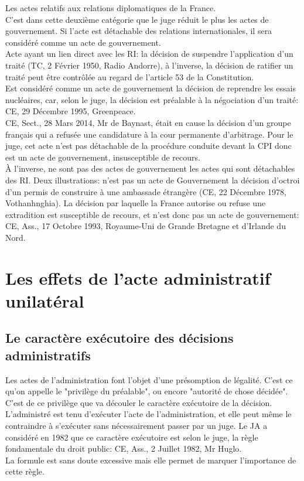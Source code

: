 \documentclass[10pt, a4paper, openany]{book}
\begin{document}
Les actes relatifs aux relations diplomatiques de la France. \\
C'est dans cette deuxième catégorie que le juge réduit le plus les actes de gouvernement. Si l'acte est détachable des relations internationales, il sera considéré comme un acte de gouvernement. \\
Acte ayant un lien direct avec les RI: la décision de suspendre l'application d'un traité (TC, 2 Février 1950, Radio Andorre), à l'inverse, la décision de ratifier un traité peut être contrôlée au regard de l'article 53 de la Constitution. \\
Est considéré comme un acte de gouvernement la décision de reprendre les essais nucléaires, car, selon le juge, la décision est préalable à la négociation d'un traité: CE, 29 Décembre 1995, Greenpeace. \\
CE, Sect., 28 Mars 2014, Mr de Baynast, était en cause la décision d'un groupe français qui a refusée une candidature à la cour permanente d'arbitrage. Pour le juge, cet acte n'est pas détachable de la procédure conduite devant la CPI donc est un acte de gouvernement, insusceptible de recours. \\
À l'inverse, ne sont pas des actes de gouvernement les actes qui sont détachables des RI. Deux illustrations: n'est pas un acte de Gouvernement la décision d'octroi d'un permis de construire à une ambassade étrangère (CE, 22 Décembre 1978, Vothanhnghia). La décision par laquelle la France autorise ou refuse une extradition est susceptible de recours, et n'est donc pas un acte de gouvernement: CE, Ass., 17 Octobre 1993, Royaume-Uni de Grande Bretagne et d'Irlande du Nord.


\section{Les effets de l'acte administratif unilatéral}

\subsection{Le caractère exécutoire des décisions administratifs}

Les actes de l'administration font l'objet d'une présomption de légalité. C'est ce qu'on appelle le "privilège du préalable", ou encore "autorité de chose décidée". C'est de ce privilège que va découler le caractère exécutoire de la décision. L'administré est tenu d'exécuter l'acte de l'administration, et elle peut même le contraindre à s'exécuter sans nécessairement passer par un juge. Le JA a considéré en 1982 que ce caractère exécutoire est selon le juge, la règle fondamentale du droit public: CE, Ass., 2 Juillet 1982, Mr Huglo. \\
La formule est sans doute excessive mais elle permet de marquer l'importance de cette règle. 
\end{document}
